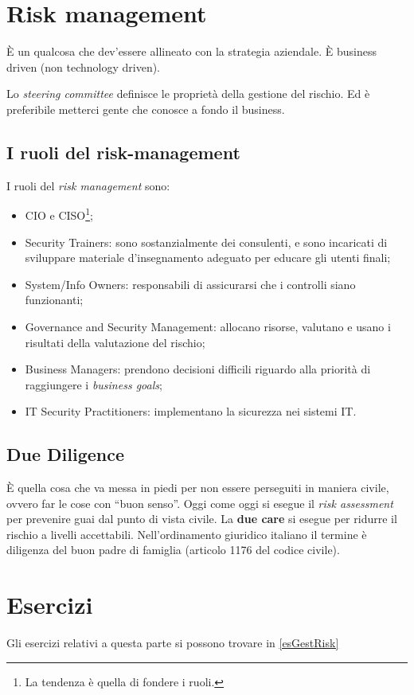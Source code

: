 \section{Risk management}

È un qualcosa che dev'essere allineato con la strategia aziendale.
È business driven (non technology driven).

Lo \textit{steering committee} definisce le proprietà della gestione del rischio.
Ed è preferibile metterci gente che conosce a fondo il business.

\subsection{I ruoli del risk-management}

I ruoli del \textit{risk management} sono:
\begin{itemize}
\item CIO e CISO\footnote{La tendenza è quella di fondere i ruoli.};
\item Security Trainers: sono sostanzialmente dei consulenti, e sono incaricati
di sviluppare materiale d'insegnamento adeguato per educare gli utenti finali;
\item System/Info Owners: responsabili di assicurarsi che i controlli siano
funzionanti;
\item Governance and Security Management: allocano risorse, valutano e usano i
risultati della valutazione del rischio;
\item Business Managers: prendono decisioni difficili riguardo alla priorità
di raggiungere i \textit{business goals};
\item IT Security Practitioners: implementano la sicurezza nei sistemi IT.
\end{itemize}

\subsection{Due Diligence}

È quella cosa che va messa in piedi per non essere perseguiti in maniera civile,
ovvero far le cose con ``buon senso''. Oggi come oggi si esegue il \textit{risk
assessment} per prevenire guai dal punto di vista civile. La \textbf{due care}
si esegue per ridurre il rischio a livelli accettabili. Nell'ordinamento
giuridico italiano il termine è diligenza del buon padre di famiglia (articolo
1176 del codice civile).


\section{Esercizi}

Gli esercizi relativi a questa parte si possono trovare in \ref{esGestRisk}
